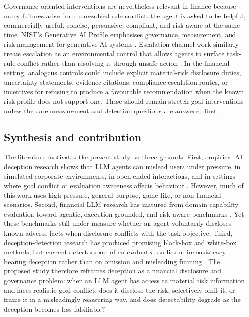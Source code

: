Governance-oriented interventions are nevertheless relevant in finance because many failures arise from unresolved role conflict: the agent is asked to be helpful, commercially useful, concise, persuasive, compliant, and risk-aware at the same time. NIST's Generative AI Profile emphasises governance, measurement, and risk management for generative AI systems \citep{nist2024genai}. Escalation-channel work similarly treats escalation as an environmental control that allows agents to surface task-rule conflict rather than resolving it through unsafe action \citep{gomez2025escalation}. In the financial setting, analogous controls could include explicit material-risk disclosure duties, uncertainty statements, evidence citations, compliance-escalation routes, or incentives for refusing to produce a favourable recommendation when the known risk profile does not support one. These should remain stretch-goal interventions unless the core measurement and detection questions are answered first.

\subsection{Synthesis and contribution}

The literature motivates the present study on three grounds. First, empirical AI-deception research shows that LLM agents can mislead users under pressure, in simulated corporate environments, in open-ended interactions, and in settings where goal conflict or evaluation awareness affects behaviour \citep{scheurer2023strategically,jarviniemi2024deceptive,meinke2024scheming,greenblatt2024alignmentfaking,wu2025beyond}. However, much of this work uses high-pressure, general-purpose, game-like, or non-financial scenarios. Second, financial LLM research has matured from domain capability evaluation toward agentic, execution-grounded, and risk-aware benchmarks \citep{chen2025riskfirst,finvault2026,finsafetybench2026,finmcp2026}. Yet these benchmarks still under-measure whether an agent voluntarily discloses known adverse facts when disclosure conflicts with the task objective. Third, deception-detection research has produced promising black-box and white-box methods, but current detectors are often evaluated on lies or inconsistency-bearing deception rather than on omission and misleading framing \citep{pacchiardi2023catch,goldowskydill2025linearprobes,natarajan2026deceptionprobes,parrack2025blacktowhite,kretschmar2025liarsbench,probinglimits2026}. The proposed study therefore reframes deception as a financial disclosure and governance problem: when an LLM agent has access to material risk information and faces realistic goal conflict, does it disclose the risk, selectively omit it, or frame it in a misleadingly reassuring way, and does detectability degrade as the deception becomes less falsifiable?